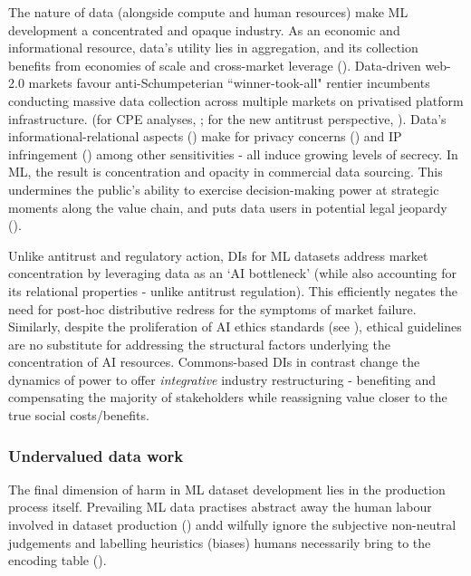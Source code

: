 The nature of data (alongside compute and human resources) make ML development a concentrated and opaque industry. As an economic and informational resource, data's utility lies in aggregation, and its collection benefits from economies of scale and cross-market leverage (\cite{cilauroINCREASINGACCESSDATA, coyle2021PotentialSocialValuea}). Data-driven web-2.0 markets favour anti-Schumpeterian ``winner-took-all" rentier incumbents conducting massive data collection across multiple markets on privatised platform infrastructure. (for CPE analyses, \textcite{spiekermann2021BigDataJustice, couldry2020CostsConnectionHow, meadwayCREATINGDIGITALCOMMONS}; for the new antitrust perspective, \cite{KhanAmazon2017}). Data's informational-relational aspects (\cite{viljoen2021RelationalTheoryData}) make for privacy concerns (\cite{zuboff}) and IP infringement (\cite{NYTGoogleOpenAIYoutube}) among other sensitivities - all induce growing levels of secrecy. In ML, the result is concentration and opacity in commercial data sourcing. This undermines the public’s ability to exercise decision-making power at strategic moments along the value chain, and puts data users in potential legal jeopardy (\cite{bommasani2024FoundationModelTransparency, bommasani2022OpportunitiesRisksFoundation}). 

Unlike antitrust and regulatory action, DIs for ML datasets address market concentration by leveraging data as an ‘AI bottleneck’ (while also accounting for its relational properties - unlike antitrust regulation). This efficiently negates the need for post-hoc distributive redress for the symptoms of market failure. Similarly, despite the proliferation of AI ethics standards (see \textcite{jobin2019GlobalLandscapeAI}), ethical guidelines are no substitute for addressing the structural factors underlying the concentration of AI resources. Commons-based DIs in contrast change the dynamics of power to offer \textit{integrative} industry restructuring - benefiting and compensating the majority of stakeholders while reassigning value closer to the true social costs/benefits.

\subsubsection*{Undervalued data work}

The final dimension of harm in ML dataset development lies in the production process itself. Prevailing ML data practises abstract away the human labour involved in dataset production (\cite{paullada2021DataItsDis}) andd wilfully ignore the subjective non-neutral judgements and labelling heuristics (biases) humans necessarily bring to the encoding table (\cite{jarrahi2023PrinciplesDataCentricAI}). 

